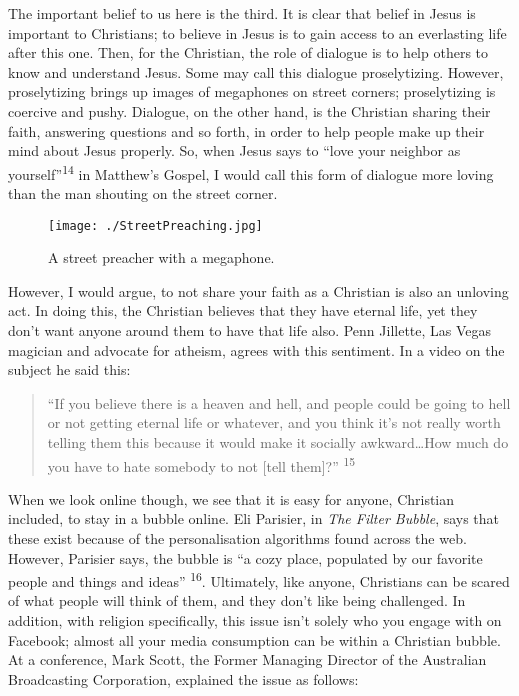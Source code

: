 \documentclass[]{article}
\begin{document}
The important belief to us here is the third. It is clear that belief in
Jesus is important to Christians; to believe in Jesus is to gain access
to an everlasting life after this one. Then, for the Christian, the role
of dialogue is to help others to know and understand Jesus. Some may
call this dialogue proselytizing. However, proselytizing brings up
images of megaphones on street corners; proselytizing is coercive and
pushy. Dialogue, on the other hand, is the Christian sharing their
faith, answering questions and so forth, in order to help people make up
their mind about Jesus properly. So, when Jesus says to ``love your
neighbor as yourself''\textsuperscript{14} in Matthew's Gospel, I would
call this form of dialogue more loving than the man shouting on the
street corner.

\begin{figure}
\centering
\texttt{[image: ./StreetPreaching.jpg]}
\caption{A street preacher with a megaphone.}
\end{figure}

However, I would argue, to not share your faith as a Christian is also
an unloving act. In doing this, the Christian believes that they have
eternal life, yet they don't want anyone around them to have that life
also. Penn Jillette, Las Vegas magician and advocate for atheism, agrees
with this sentiment. In a video on the subject he said this:

\begin{quote}
``If you believe there is a heaven and hell, and people could be going
to hell or not getting eternal life or whatever, and you think it's not
really worth telling them this because it would make it socially
awkward\ldots{}How much do you have to hate somebody to not {[}tell
them{]}?'' \textsuperscript{15}
\end{quote}

When we look online though, we see that it is easy for anyone, Christian
included, to stay in a bubble online. Eli Parisier, in \emph{The Filter
Bubble}, says that these exist because of the personalisation algorithms
found across the web. However, Parisier says, the bubble is ``a cozy
place, populated by our favorite people and things and ideas''
\textsuperscript{16}. Ultimately, like anyone, Christians can be scared
of what people will think of them, and they don't like being challenged.
In addition, with religion specifically, this issue isn't solely who you
engage with on Facebook; almost all your media consumption can be within
a Christian bubble. At a conference, Mark Scott, the Former Managing
Director of the Australian Broadcasting Corporation, explained the issue
as follows:
\end{document}
